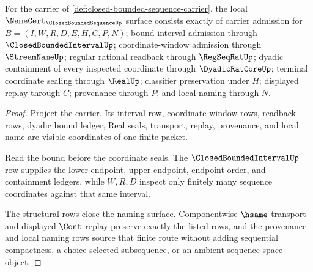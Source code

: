 \begin{theorem}
\label{thm:closed-bounded-sequence-namecert-obligations}
For the carrier of \autoref{def:closed-bounded-sequence-carrier}, the local $\NameCert_{\ClosedBoundedSequenceUp}$ surface consists exactly of carrier admission for $B=(I,W,R,D,E,H,C,P,N)$; bound-interval admission through $\ClosedBoundedIntervalUp$; coordinate-window admission through $\StreamNameUp$; regular rational readback through $\RegSeqRatUp$; dyadic containment of every inspected coordinate through $\DyadicRatCoreUp$; terminal coordinate sealing through $\RealUp$; classifier preservation under $H$; displayed replay through $C$; provenance through $P$; and local naming through $N$.
\end{theorem}
\begin{proof}
Project the carrier. Its interval row, coordinate-window rows, readback rows, dyadic bound ledger, Real seals, transport, replay, provenance, and local name are visible coordinates of one finite packet.

Read the bound before the coordinate seals. The $\ClosedBoundedIntervalUp$ row supplies the lower endpoint, upper endpoint, endpoint order, and containment ledgers, while $W,R,D$ inspect only finitely many sequence coordinates against that same interval.

The structural rows close the naming surface. Componentwise $\hsame$ transport and displayed $\Cont$ replay preserve exactly the listed rows, and the provenance and local naming rows source that finite route without adding sequential compactness, a choice-selected subsequence, or an ambient sequence-space object.
\end{proof}

